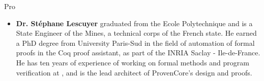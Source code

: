 \begin{sitedescription}{Pro}
\begin{itemize}
\item {\bf Dr. Stéphane Lescuyer} graduated from the Ecole
  Polytechnique and is a State Engineer of the Mines, a technical
  corps of the French state. He earned a PhD degree from University
  Paris-Sud in the field of automation of formal proofs in the Coq
  proof assistant, as part of the INRIA Saclay - Ile-de-France. He
  has ten years of experience of working on formal methods and
  program verification at \provenrun, and is the lead architect
  of ProvenCore's design and proofs.
\end{itemize}

\end{sitedescription}

